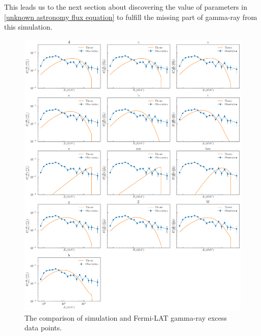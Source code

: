 \documentclass[10pt, oneside]{book}
\numberwithin{equation}{chapter}
\begin{document}
This leads us to the next section about discovering the value of parameters in \autoref{unknown astronomy flux equation} to fulfill the missing part of gamma-ray from this simulation.

\begin{figure}[h]
    \centering
    \includegraphics[width=\linewidth]{images/best fit not all no unknow astronomy parameter_2.png}
    \caption{The comparison of simulation and Fermi-LAT gamma-ray excess data points.}
    \label{fig: various DM}
\end{figure}
\newpage
\end{document}
